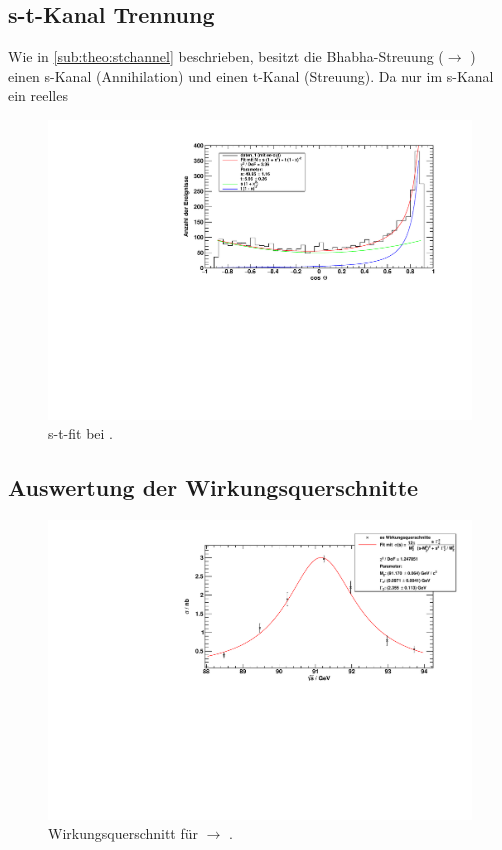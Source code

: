 \subsection{s-t-Kanal Trennung}
Wie in \autoref{sub:theo:stchannel} beschrieben, besitzt die Bhabha-Streuung (\ee $\to$ \ee) einen s-Kanal (Annihilation) 
und einen t-Kanal (Streuung). Da nur im s-Kanal ein reelles 

\begin{figure}[H]
\begin{center}
  \includegraphics[width=\textwidth]{../img/s_t_fit_91-23.pdf}
  \caption{s-t-fit bei .}
  \label{img:label}
\end{center}
\end{figure}

\subsection{Auswertung der Wirkungsquerschnitte}
\begin{figure}[H]
\begin{center}
  \includegraphics[width=\textwidth]{../img/crosssections_ee.pdf}
  \caption{Wirkungsquerschnitt für \ee $\to$ \ee.}
  \label{img:crosssection:ee}
\end{center}
\end{figure}

